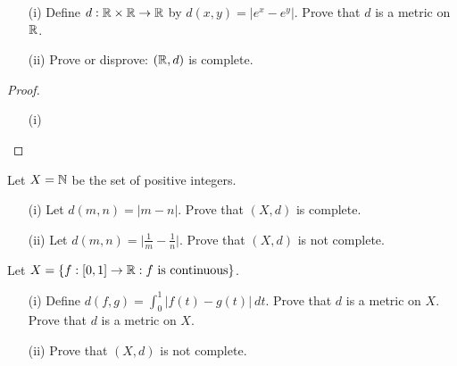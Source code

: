 \documentclass[a4paper]{article}
\begin{document}
\begin{problem}
    \begin{enumerate}
        \item[(i)] Define \( d: \mathbb{R} \times \mathbb{R} \to \mathbb{R}  \) by \( d(x,y) = | e^{x} - e^{y} |  \). Prove that \( d \) is a metric on \( \mathbb{R}  \).
        \item[(ii)] Prove or disprove: \( (\mathbb{R} , d) \) is complete.
    \end{enumerate}
\end{problem}
\begin{proof}
\begin{enumerate}
    \item[(i)]
\end{enumerate}
\end{proof}

\begin{problem}
    Let \( X = \mathbb{N} \) be the set of positive integers.
\begin{enumerate}
    \item[(i)] Let \( d(m,n) = | m - n |  \). Prove that \( (X,d) \) is complete.
    \item[(ii)] Let \( d(m,n) = \Big| \frac{ 1 }{ m }  - \frac{ 1 }{ n }  \Big|  \). Prove that \( (X,d) \) is not complete.
\end{enumerate}
\end{problem}

\begin{problem}
    Let \( X = \{ f: [0,1] \to \mathbb{R} : f \ \text{is continuous} \}  \).
       \begin{enumerate}
           \item[(i)] Define \( d(f,g) = \displaystyle \int_{ 0 }^{ 1 }  | f(t) - g(t) |  \ dt \). Prove that \( d \) is  a metric on \( X  \). Prove that \( d \) is a metric on \( X  \).
            \item[(ii)] Prove that \( (X,d) \) is not complete.
       \end{enumerate} 
\end{problem}
\end{document}
